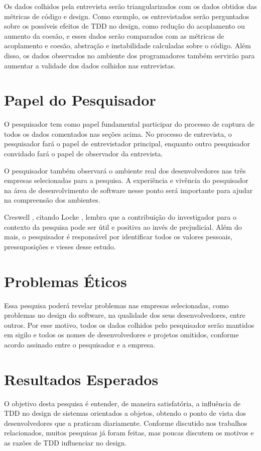 Os dados colhidos pela entrevista serão triangularizados com os dados obtidos das métricas de código e design. 
Como exemplo, os entrevistados serão perguntados sobre os possíveis efeitos de TDD no design, como redução do acoplamento ou
aumento da coesão, e esses dados serão comparados com as métricas de acoplamento e coesão, abstração e instabilidade 
calculadas sobre o código.
Além disso, os dados observados no ambiente dos programadores também servirão para aumentar a validade dos 
dados colhidos nas entrevistas.

\section{Papel do Pesquisador}
\label{sec:planejamento-papel}

O pesquisador tem como papel fundamental participar do processo de captura de todos os dados comentados
nas seções acima. No processo de entrevista, o pesquisador fará o papel de entrevistador principal, enquanto outro
pesquisador convidado fará o papel de observador da entrevista.

O pesquisador também observará o ambiente real dos desenvolvedores nas três empresas selecionadas
para a pesquisa. A experiência e vivência do pesquisador na área de desenvolvimento de software 
nesse ponto será importante para ajudar na compreensão dos ambientes. 

Creswell \cite{creswell}, citando Locke \cite{locke}, lembra
que a contribuição do investigador para o contexto da pesquisa pode ser útil e positiva ao invés de prejudicial.
Além do mais, o pesquisador é responsável por identificar todos os valores pessoais, pressuposições e vieses desse estudo.

\section{Problemas Éticos}
\label{sec:planejamento-etica}

Essa pesquisa poderá revelar problemas nas empresas selecionadas, como problemas no design do software, na
qualidade dos seus desenvolvedores, entre outros. Por esse motivo, todos os dados colhidos pelo pesquisador
serão mantidos em sigilo e todos os nomes de desenvolvedores e projetos omitidos, conforme acordo assinado entre o pesquisador e a empresa.


\section{Resultados Esperados}
\label{sec:planejamento-resultados-esperados}

O objetivo desta pesquisa é entender, de maneira satisfatória, a influência de TDD no design
de sistemas orientados a objetos, obtendo o ponto de vista dos desenvolvedores que a praticam diariamente. 
Conforme discutido nos trabalhos relacionados, muitos pesquisas já foram feitas, 
mas poucas discutem os motivos e as razões de TDD influenciar no design.


